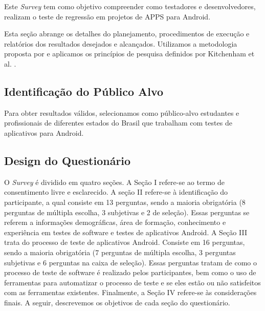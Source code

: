 Este \textit{Survey} tem como objetivo compreender como testadores e desenvolvedores, realizam o teste de regressão em projetos de \ac{APPS} para Android.

Esta seção abrange os detalhes do planejamento, procedimentos de execução e relatórios dos resultados desejados e alcançados. Utilizamos a metodologia proposta por  e aplicamos os princípios de pesquisa definidos por Kitchenham et al. .


\subsection{Identificação do Público Alvo}

Para obter resultados válidos, selecionamos como público-alvo estudantes e profissionais de diferentes estados do Brasil que trabalham com testes de aplicativos para Android. 


\begin{comment}
Foram considerados três critérios:

\begin{enumerate}
    \item Pessoas que trabalham de forma autônoma; 
    \item Pessoas que trabalham / pesquisam em uma empresa; 
    \item Alunos pesquisando tópicos relacionados.
\end{enumerate}

\end{comment}

\subsection{Design do Questionário}


O \textit{Survey} é dividido em quatro seções. A Seção I refere-se ao termo de consentimento livre e esclarecido. A seção II refere-se à identificação do participante, a qual consiste em 13 perguntas, sendo a maioria obrigatória (8 perguntas de múltipla escolha, 3 subjetivas e 2 de seleção). Essas perguntas se referem a informações demográficas, área de formação, conhecimento e experiência em testes de software e testes de aplicativos Android. A Seção III trata do processo de teste de aplicativos Android. Consiste em 16 perguntas, sendo a maioria obrigatória (7 perguntas de múltipla escolha, 3 perguntas subjetivas e 6 perguntas na caixa de seleção). Essas perguntas tratam de como o processo de teste de software é realizado pelos participantes, bem como o uso de ferramentas para automatizar o processo de teste e se eles estão ou não satisfeitos com as ferramentas existentes. Finalmente, a Seção IV refere-se às considerações finais. A seguir, descrevemos os objetivos de cada seção do questionário.


